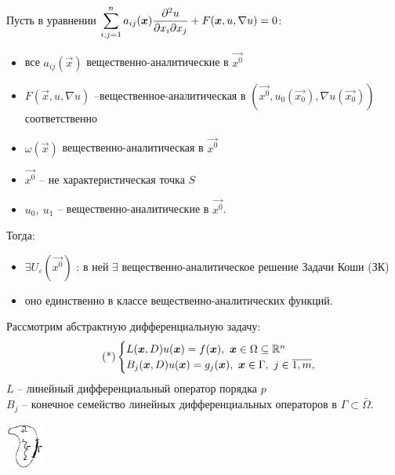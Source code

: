 \begin{theorem}[Ковалевской]
Пусть в уравнении $\displaystyle\sum\limits_{i,j=1}^{n} a_{ij}(\boldsymbol{x})\frac{\partial^2u}{\partial x_i\partial x_j} + F(\boldsymbol{x}, u, \nabla u) = 0$:
\begin{itemize}[noitemsep]
\item все $a_{ij}(\vec{x})$ вещественно-аналитические в $\vec{x^0}$ 
\item $F(\vec{x}, u, \nabla u)$ --вещественное-аналитическая в $(\vec{x^0}, u_0(\vec{x_0}), \nabla u(\vec{x_0}))$ соответственно 
\item $\omega(\vec{x})$ вещественно-аналитическая в $\vec{x^0}$
\item $\vec{x^0}$ -- не характеристическая точка $S$
\item $u_0,\ u_1$ -- вещественно-аналитические в $\vec{x^0}$.
\end{itemize}
Тогда: 
\begin{itemize}[noitemsep]
\item $\exists U_{\varepsilon}(\vec{x^0})$ : в ней $\exists$ вещественно-аналитическое решение Задачи Коши (ЗК)
\item оно единственно в классе вещественно-аналитических функций.
\end{itemize}
\end{theorem}

Рассмотрим абстрактную дифференциальную задачу:\\
\begin{equation}
\label{eq::2::diff}
\tag{*}
\begin{cases} L(\vec{x}, D)u(\vec{x}) = f(\vec{x}),\ \vec{x} \in \Omega \subseteq \R^n  \\
B_j(\vec{x},D) u(\vec{x}) = g_j(\vec{x}),\ \vec{x}\in \Gamma,\ j\in\overline{1,m},
\end{cases}
\end{equation}
$L$ -- линейный дифференциальный оператор порядка $p$\\
$B_j$ -- конечное семейство линейных дифференциальных операторов в $\Gamma \subset \bar{\Omega}$.

\begin{center}
\includegraphics[width=0.1\textwidth]{2_3_new}
\end{center}

